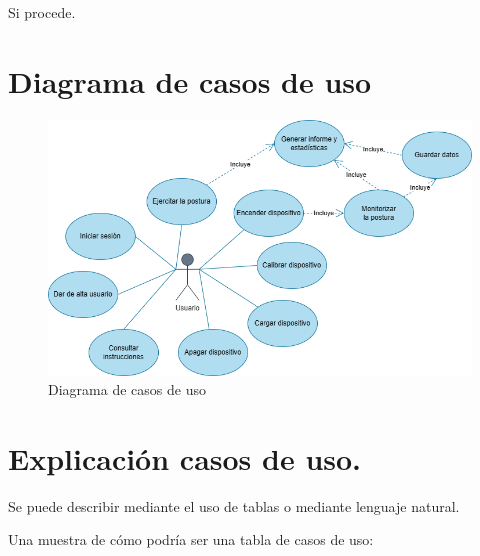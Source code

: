 
Si procede.


\section{Diagrama de casos de uso}

\begin{figure}[h]
    \centering
    \includegraphics[width=1\textwidth]{img/DiagramaCasosDeUso.png}
    \caption{Diagrama de casos de uso}
    \label{fig:Casosuso} %
\end{figure}

\section{Explicación casos de uso.}



Se puede describir mediante el uso de tablas o mediante lenguaje natural.   

Una muestra de cómo podría ser una tabla de casos de uso:

